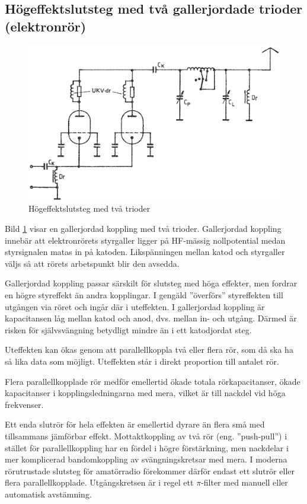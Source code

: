 \subsection{Högeffektslutsteg med två gallerjordade trioder (elektronrör)}

\begin{figure}
\includegraphics[width=\textwidth]{images/cropped_pdfs/bild_2_3-51.pdf}
\caption{Högeffektslutsteg med två trioder}
\label{fig:BildII3-51}
\end{figure}

Bild \ref{fig:BildII3-51} visar en gallerjordad koppling med två trioder.
Gallerjordad koppling innebär att elektronrörets styrgaller ligger på
HF-mässig nollpotential medan styrsignalen matas in på katoden.
Likspänningen mellan katod och styrgaller väljs så att rörets arbetspunkt blir
den avsedda.

Gallerjordad koppling passar särskilt för slutsteg med höga effekter,
men fordrar en högre styreffekt än andra kopplingar.
I gengäld ''överförs'' styreffekten till utgången via röret och ingår där i
uteffekten.
I gallerjordad koppling är kapacitansen låg mellan katod och anod, dvs.
mellan in- och utgång.
Därmed är risken för självsvängning betydligt mindre än i ett katodjordat steg.

Uteffekten kan ökas genom att parallellkoppla två eller flera rör, som
då ska ha så lika data som möjligt.
Uteffekten står i direkt proportion till antalet rör.

Flera parallellkopplade rör medför emellertid ökade totala rörkapacitanser,
ökade kapacitanser i kopplingsledningarna med mera, vilket är till nackdel vid
höga frekvenser.

Ett enda slutrör för hela effekten är emellertid dyrare än flera små
med tillsammans jämförbar effekt.
Mottaktkoppling av två rör (eng. ''push-pull'') i stället för parallellkoppling
har en fördel i högre förstärkning, men nackdelar i mer komplicerad
bandomkoppling av svängningskretsar med mera.
I moderna rörutrustade slutsteg för amatörradio förekommer därför endast ett
slutrör eller flera parallellkopplade.
Utgångskretsen är i regel ett \(\pi \)-filter med manuell eller automatisk
avstämning.


